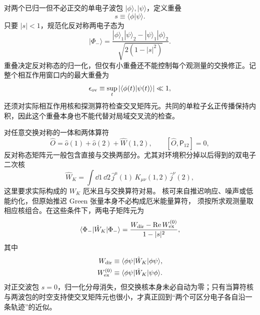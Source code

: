 对两个已归一但不必正交的单电子波包 $|\phi\rangle,|\psi\rangle$，定义重叠
\[
s\equiv\langle\phi|\psi\rangle .
\]
只要 $|s|<1$，规范化反对称两电子态为
\begin{equation}
{
|\Phi_-\rangle
=
\frac{
|\phi\rangle_1|\psi\rangle_2
-
|\psi\rangle_1|\phi\rangle_2
}{
\sqrt{2(1-|s|^2)}
}.}
\label{eq:two_electron_antisym_wavepacket_state}
\end{equation}
重叠决定反对称态的归一化，但仅有小重叠还不能控制每个观测量的交换修正。记整个相互作用窗口内的最大重叠为
\[
\epsilon_{\rm ov}
\equiv
\sup_t|\langle\phi(t)|\psi(t)\rangle|
\ll1,
\]
还须对实际相互作用核和探测算符检查交叉矩阵元。共同的单粒子幺正传播保持内积，因此这个重叠本身也不能代替对局域交叉流的检查。

对任意交换对称的一体和两体算符
\[
\hat O
=
\hat o(1)+\hat o(2)+\hat W(1,2),
\qquad
[\hat O,\mathsf P_{12}]=0,
\]
反对称态矩阵元一般包含直接与交换两部分。尤其对环境积分掉以后得到的双电子二次核
\[
\hat W_K
=
\int\dd1\,\dd2\,
\hat j^\mu(1)\,
K_{\mu\nu}(1,2)\,
\hat j^\nu(2),
\]
这里要求实际构成的 $W_K$ 厄米且与交换算符对易。
核可来自推迟响应、噪声或低能约化，但原始推迟 Green 张量本身不必构成厄米能量算符，
须按所求观测量取相应核组合。在这些条件下，两电子矩阵元为
\begin{equation}
{
\langle\Phi_-|\hat W_K|\Phi_-\rangle
=
\frac{
W_{\rm dir}-\operatorname{Re}W_{\rm ex}^{(0)}
}{
1-|s|^2},
}
\label{eq:two_electron_direct_exchange_kernel}
\end{equation}
其中
\begin{align*}
W_{\rm dir}
&\equiv
\langle\phi\psi|\hat W_K|\phi\psi\rangle,\\
W_{\rm ex}^{(0)}
&\equiv
\langle\phi\psi|\hat W_K|\psi\phi\rangle.
\end{align*}
对正交波包 $s=0$，归一化分母消失，但交换核本身未必自动为零；只有当算符核与两波包的时空支持使交叉矩阵元也很小，才真正回到“两个可区分电子各自沿一条轨迹”的近似。

